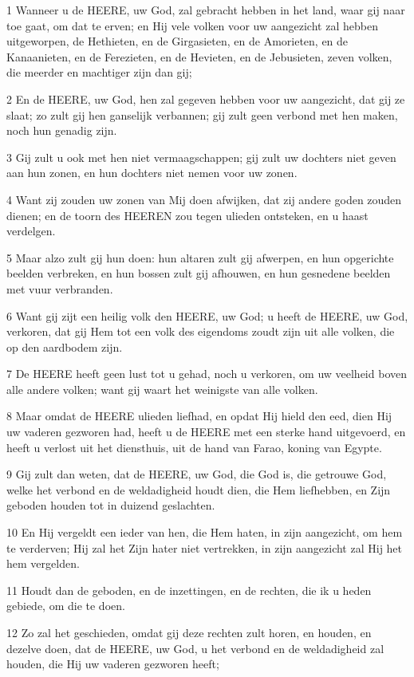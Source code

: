 \par 1 Wanneer u de HEERE, uw God, zal gebracht hebben in het land, waar gij naar toe gaat, om dat te erven; en Hij vele volken voor uw aangezicht zal hebben uitgeworpen, de Hethieten, en de Girgasieten, en de Amorieten, en de Kanaanieten, en de Ferezieten, en de Hevieten, en de Jebusieten, zeven volken, die meerder en machtiger zijn dan gij;
\par 2 En de HEERE, uw God, hen zal gegeven hebben voor uw aangezicht, dat gij ze slaat; zo zult gij hen ganselijk verbannen; gij zult geen verbond met hen maken, noch hun genadig zijn.
\par 3 Gij zult u ook met hen niet vermaagschappen; gij zult uw dochters niet geven aan hun zonen, en hun dochters niet nemen voor uw zonen.
\par 4 Want zij zouden uw zonen van Mij doen afwijken, dat zij andere goden zouden dienen; en de toorn des HEEREN zou tegen ulieden ontsteken, en u haast verdelgen.
\par 5 Maar alzo zult gij hun doen: hun altaren zult gij afwerpen, en hun opgerichte beelden verbreken, en hun bossen zult gij afhouwen, en hun gesnedene beelden met vuur verbranden.
\par 6 Want gij zijt een heilig volk den HEERE, uw God; u heeft de HEERE, uw God, verkoren, dat gij Hem tot een volk des eigendoms zoudt zijn uit alle volken, die op den aardbodem zijn.
\par 7 De HEERE heeft geen lust tot u gehad, noch u verkoren, om uw veelheid boven alle andere volken; want gij waart het weinigste van alle volken.
\par 8 Maar omdat de HEERE ulieden liefhad, en opdat Hij hield den eed, dien Hij uw vaderen gezworen had, heeft u de HEERE met een sterke hand uitgevoerd, en heeft u verlost uit het diensthuis, uit de hand van Farao, koning van Egypte.
\par 9 Gij zult dan weten, dat de HEERE, uw God, die God is, die getrouwe God, welke het verbond en de weldadigheid houdt dien, die Hem liefhebben, en Zijn geboden houden tot in duizend geslachten.
\par 10 En Hij vergeldt een ieder van hen, die Hem haten, in zijn aangezicht, om hem te verderven; Hij zal het Zijn hater niet vertrekken, in zijn aangezicht zal Hij het hem vergelden.
\par 11 Houdt dan de geboden, en de inzettingen, en de rechten, die ik u heden gebiede, om die te doen.
\par 12 Zo zal het geschieden, omdat gij deze rechten zult horen, en houden, en dezelve doen, dat de HEERE, uw God, u het verbond en de weldadigheid zal houden, die Hij uw vaderen gezworen heeft;
